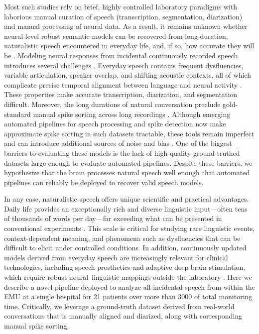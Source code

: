 \documentclass[pdflatex,sn-basic]{sn-jnl}%
\theoremstyle{thmstyleone}%
\theoremstyle{thmstyletwo}%
\theoremstyle{thmstylethree}%
\begin{document}
Most such studies rely on brief, highly controlled laboratory paradigms with
laborious manual curation of speech (transcription, segmentation, diarization)
and manual processing of neural data. As a
result, it remains unknown whether neural-level robust semantic models can be recovered from
long-duration, naturalistic speech encountered in everyday life, and, if so, how
accurate they will be \citep{bib27,bib28,bib29,bib30,bib31}. Modeling neural responses from incidental
continuously recorded speech introduces several challenges
\citep{bib32,bib27,bib22}. Everyday speech contains frequent dysfluencies,
variable articulation, speaker overlap, and shifting acoustic contexts, all of
which complicate precise temporal alignment between language and neural activity
\citep{bib33,bib34,bib35,bib36}. These properties make accurate transcription,
diarization, and segmentation difficult. Moreover, the long durations of natural
conversation preclude gold-standard manual spike sorting across long recordings
\citep{bib37,bib38}. Although emerging automated pipelines for speech processing
and spike detection now make approximate spike sorting in such datasets
tractable, these tools remain imperfect and can introduce additional sources of
noise and bias \citep{bib39,bib105,bib106,bib107,bib108,bib109,bib110,bib111}. One of the biggest barriers to evaluating these
models is the lack of high-quality ground-truthed datasets large enough to
evaluate automated pipelines. Despite these barriers, we hypothesize that the brain processes natural speech well enough that automated pipelines can reliably be deployed to recover valid speech models.

In any case, naturalistic speech offers unique scientific and
practical advantages. Daily life provides an exceptionally rich and diverse
linguistic input---often tens of thousands of words per day---far exceeding what
can be presented in conventional experiments \citep{bib32,bib22,bib40,bib27}.
This scale is critical for studying rare linguistic events, context-dependent
meaning, and phenomena such as dysfluencies that can be difficult to elicit under
controlled conditions. In addition, continuously updated models derived from
everyday speech are increasingly relevant for clinical technologies, including
speech prosthetics and adaptive deep brain stimulation, which require robust
neural--linguistic mappings outside the laboratory \citep{bib102,bib41,bib42}.
Here we describe a novel pipeline deployed to analyze all incidental speech from
within the EMU at a single hospital for 21 patients over more than 3000 of total monitoring time. Critically,
we leverage a ground-truth dataset derived from real-world conversations that is
manually aligned and diarized, along with corresponding manual spike sorting.
\end{document}
